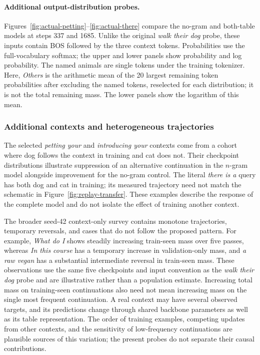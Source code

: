 
\paragraph{Additional output-distribution probes.}
Figures~\ref{fig:actual-petting}--\ref{fig:actual-there} compare the no-gram and both-table models at steps 337 and 1685. Unlike the original \emph{walk their dog} probe, these inputs contain BOS followed by the three context tokens. Probabilities use the full-vocabulary softmax; the upper and lower panels show probability and log probability. The named animals are single tokens under the training tokenizer. Here, \emph{Others} is the arithmetic mean of the 20 largest remaining token probabilities after excluding the named tokens, reselected for each distribution; it is not the total remaining mass. The lower panels show the logarithm of this mean.

\subsubsection{Additional contexts and heterogeneous trajectories}
\label{app:actual-logits}

The selected \emph{petting your} and \emph{introducing your} contexts come from a cohort where dog follows the context in training and cat does not. Their checkpoint distributions illustrate suppression of an alternative continuation in the $n$-gram model alongside improvement for the no-gram control. The literal \emph{there is a} query has both dog and cat in training; its measured trajectory need not match the schematic in Figure~\ref{fig:replay-transfer}. These examples describe the response of the complete model and do not isolate the effect of training another context.

The broader seed-42 context-only survey contains monotone trajectories, temporary reversals, and cases that do not follow the proposed pattern. For example, \emph{What do I} shows steadily increasing train-seen mass over five passes, whereas \emph{In this course} has a temporary increase in validation-only mass, and \emph{a raw vegan} has a substantial intermediate reversal in train-seen mass. These observations use the same five checkpoints and input convention as the \emph{walk their dog} probe and are illustrative rather than a population estimate. Increasing total mass on training-seen continuations also need not mean increasing mass on the single most frequent continuation. A real context may have several observed targets, and its predictions change through shared backbone parameters as well as its table representation. The order of training examples, competing updates from other contexts, and the sensitivity of low-frequency continuations are plausible sources of this variation; the present probes do not separate their causal contributions.


